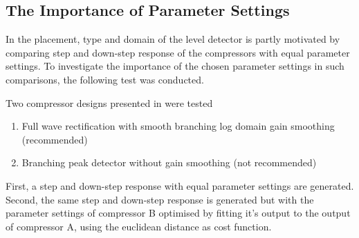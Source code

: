 \documentclass[../main2.tex]{subfiles}
\begin{document}
\subsection{The Importance of Parameter Settings}\label{method_param_opt}
In \cite{reiss2012tutorial} the placement, type and domain of the level detector is partly motivated by comparing step and down-step response of the compressors with equal parameter settings. To investigate the importance of the chosen parameter settings in such comparisons, the following test was conducted.

Two compressor designs presented in \cite{reiss2012tutorial} were tested
\begin{enumerate}[label=(\Alph*)]
 \item Full wave rectification with smooth branching log domain gain smoothing (recommended)
\item  Branching peak detector without gain smoothing (not recommended)
\end{enumerate}
First, a step and down-step response with equal parameter settings are generated. Second, the same step and down-step response is generated but with the parameter settings of compressor B optimised by fitting it's output to the output of compressor A, using the euclidean distance as cost function.
\end{document}

